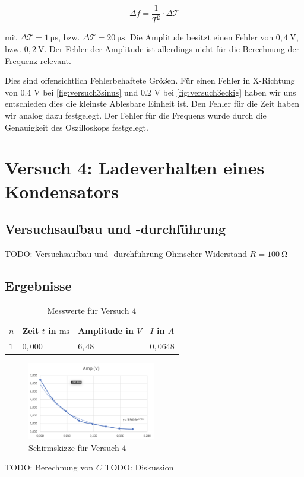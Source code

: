         \begin{equation}
            \Delta f = \frac{1}{T^2} \cdot \Delta \mathcal{T}
            \label{eq:größtfehler}
        \end{equation}

        mit $\Delta \mathcal{T} = 1\ \mathrm{\mu s}$, bzw. $\Delta \mathcal{T} = 20\ \mathrm{\mu s}$. Die Amplitude besitzt einen Fehler von $0,4\ \mathrm{V}$, bzw. $0,2\ \mathrm{V}$. Der Fehler der Amplitude ist allerdings nicht für die Berechnung der Frequenz relevant.

        Dies sind offensichtlich Fehlerbehaftete Größen. Für einen Fehler in X-Richtung von 0.4 V bei \ref{fig:versuch3sinus} und 0.2 V bei \ref{fig:versuch3eckig} haben wir uns entschieden dies die kleinste Ablesbare Einheit ist. Den Fehler für die Zeit haben wir analog dazu festgelegt. Der Fehler für die Frequenz wurde durch die Genauigkeit des Oszilloskops festgelegt.

\section{Versuch 4: Ladeverhalten eines Kondensators}

    \subsection{Versuchsaufbau und -durchführung}

        TODO: Versuchsaufbau und -durchführung
        Ohmscher Widerstand $R = 100\ \mathrm{\Omega}$

    \subsection{Ergebnisse}
        
        \begin{table}[h!]
            \centering
            \begin{tabular}{|l|l|l|l|}
                \hline
                $n$ & Zeit $t$ in $\mathrm{ms}$ & Amplitude in $V$ & $I$ in $A$\\
                \hline\hline
                $1$ & $0,000$ & $6,48$ & $0,0648$\\
                \hline
            \end{tabular}
            \caption{Messwerte für Versuch 4}
            \label{tab:versuch4}
        \end{table}

        \begin{figure}[h!]
            \centering
            \includegraphics[width=0.5\textwidth]{bilder/Physik_05.png}
            \caption{Schirmskizze für Versuch 4}
            \label{fig:versuch4}
        \end{figure}

        TODO: Berechnung von $C$
        TODO: Diskussion